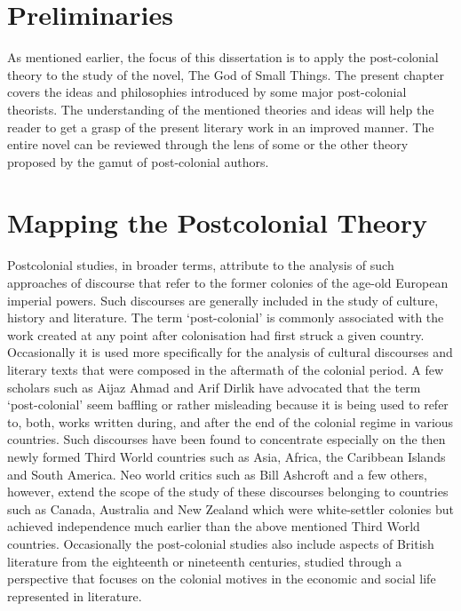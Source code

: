 
\section{Preliminaries}

As mentioned earlier, the focus of this dissertation is to apply the post-colonial theory to the study of the novel, The God of Small Things. The present chapter covers the ideas and philosophies introduced by some major post-colonial theorists. The understanding of the mentioned theories and ideas will help the reader to get a grasp of the present literary work in an improved manner. The entire novel can be reviewed through the lens of some or the other theory proposed by the gamut of post-colonial authors.

\section{Mapping the Postcolonial Theory}

Postcolonial studies, in broader terms, attribute to the analysis of such approaches of discourse that refer to the former colonies of the age-old European imperial powers. Such discourses are generally included in the study of culture, history and literature. The term ‘post-colonial’ is commonly associated with the work created at any point after colonisation had first struck a given country. Occasionally it is used more specifically for the analysis of cultural discourses and literary texts that were composed in the aftermath of the colonial period. A few scholars such as Aijaz Ahmad and Arif Dirlik have advocated that the term ‘post-colonial’ seem baffling or rather misleading because it is being used to refer to, both, works written during, and after the end of the colonial regime in various countries. Such discourses have been found to concentrate especially on the then newly formed Third World countries such as Asia, Africa, the Caribbean Islands and South America. Neo world critics such as Bill Ashcroft and a few others, however, extend the scope of the study of these discourses belonging to countries such as Canada, Australia and New Zealand which were white-settler colonies but achieved independence much earlier than the above mentioned Third World countries. Occasionally the post-colonial studies also include aspects of British literature from the eighteenth or nineteenth centuries, studied through a perspective that focuses on the colonial motives in the economic and social life represented in literature. 

